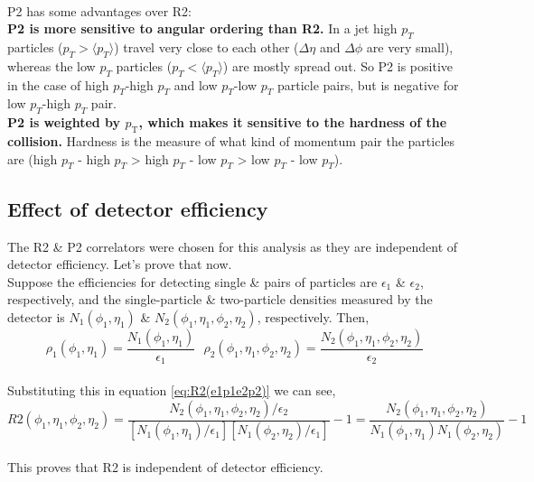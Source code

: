\documentclass[12pt,a4paper,twoside]{report}
\begin{document}
\\
P2 has some advantages over R2:\\
\textbf{P2 is more sensitive to angular ordering than R2.} In a jet high $p_T$ particles ($p_T>\langle p_T \rangle$) travel very close to each other ($\Delta\eta$ and $\Delta\phi$ are very small), whereas the low $p_T$ particles ($p_T<\langle p_T \rangle$) are mostly spread out. So P2 is positive in the case of high $p_T$-high $p_T$ and low $p_T$-low $p_T$ particle pairs, but is negative for low $p_T$-high $p_T$ pair.\\
\textbf{P2 is weighted by $p_\mathrm{T}$, which makes it sensitive to the hardness of the collision.} Hardness is the measure of what kind of momentum pair the particles are (high $p_T$ - high $p_T$ > high $p_T$ - low $p_T$ > low $p_T$ - low $p_T$).

\subsection{Effect of detector efficiency}
The R2 \& P2 correlators were chosen for this analysis as they are independent of detector efficiency. Let's prove that now.\\
Suppose the efficiencies for detecting single \& pairs of particles are $\epsilon_1$ \& $\epsilon_2$, respectively, and the single-particle \& two-particle densities measured by the detector is $N_1(\phi_1,\eta_1)$ \& $N_2(\phi_1,\eta_1,\phi_2,\eta_2)$, respectively. Then,
\begin{equation}\label{eq:rho1rho2eff}
	\rho_1(\phi_1,\eta_1)=\frac{N_1(\phi_1,\eta_1)}{\epsilon_1}\ \ \ \rho_2(\phi_1,\eta_1,\phi_2,\eta_2)=\frac{N_2(\phi_1,\eta_1,\phi_2,\eta_2)}{\epsilon_2}
\end{equation}
\\
Substituting this in equation \ref{eq:R2(e1p1e2p2)} we can see,
\begin{equation}
	R2(\phi_1,\eta_1,\phi_2,\eta_2)=\frac{N_2(\phi_1,\eta_1,\phi_2,\eta_2)/\epsilon_2}{[N_1(\phi_1,\eta_1)/\epsilon_1][N_1(\phi_2,\eta_2)/\epsilon_1]}-1=\frac{N_2(\phi_1,\eta_1,\phi_2,\eta_2)}{N_1(\phi_1,\eta_1)N_1(\phi_2,\eta_2)}-1
\end{equation}
\\
This proves that R2 is independent of detector efficiency.\\
\end{document}
